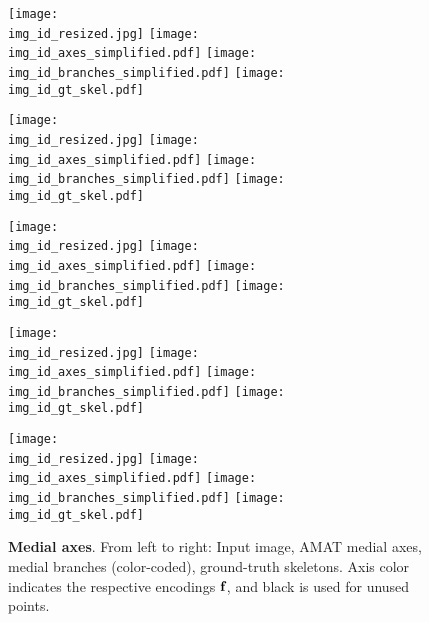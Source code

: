 \documentclass[10pt,twocolumn,letterpaper]{article}
\begin{document}
\begin{figure*}[t]
\centering
\def\imgw{0.245}

\def\img_id{85048}
\texttt{[image: \\img\_id\_resized.jpg]}
\texttt{[image: \\img\_id\_axes\_simplified.pdf]}
\texttt{[image: \\img\_id\_branches\_simplified.pdf]}
\texttt{[image: \\img\_id\_gt\_skel.pdf]}

\def\img_id{295087}
\texttt{[image: \\img\_id\_resized.jpg]}
\texttt{[image: \\img\_id\_axes\_simplified.pdf]}
\texttt{[image: \\img\_id\_branches\_simplified.pdf]}
\texttt{[image: \\img\_id\_gt\_skel.pdf]}

\def\img_id{145086}
\texttt{[image: \\img\_id\_resized.jpg]}
\texttt{[image: \\img\_id\_axes\_simplified.pdf]}
\texttt{[image: \\img\_id\_branches\_simplified.pdf]}
\texttt{[image: \\img\_id\_gt\_skel.pdf]}

\def\img_id{101087}
\texttt{[image: \\img\_id\_resized.jpg]}
\texttt{[image: \\img\_id\_axes\_simplified.pdf]}
\texttt{[image: \\img\_id\_branches\_simplified.pdf]}
\texttt{[image: \\img\_id\_gt\_skel.pdf]}

\def\img_id{54082}
\texttt{[image: \\img\_id\_resized.jpg]}
\texttt{[image: \\img\_id\_axes\_simplified.pdf]}
\texttt{[image: \\img\_id\_branches\_simplified.pdf]}
\texttt{[image: \\img\_id\_gt\_skel.pdf]}
\caption{\textbf{Medial axes}. From left to right: Input image, AMAT medial axes, medial branches (color-coded), ground-truth skeletons.
Axis color indicates the respective encodings $\mathbf{f}_{}$, and black is used for unused points.}
\label{fig:axes}
\end{figure*}
\end{document}
